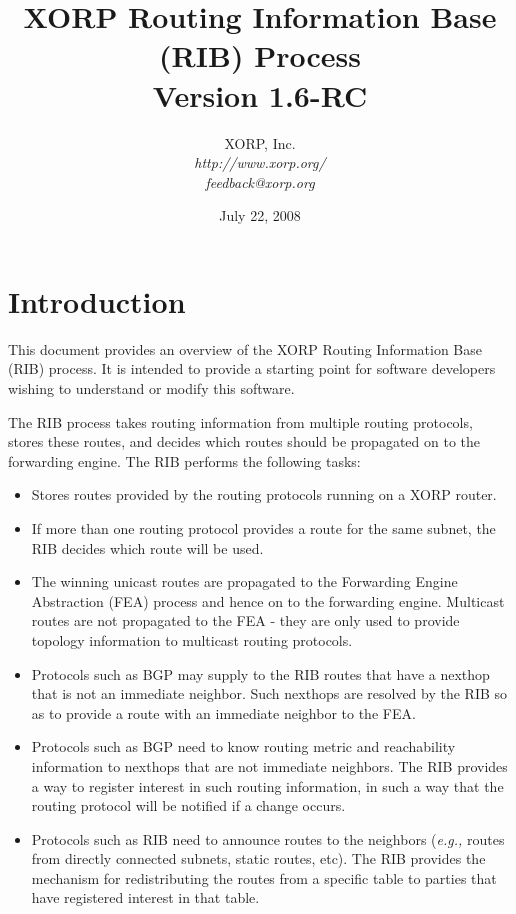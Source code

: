 \documentclass[11pt]{article}
\newcommand{\eg}{\emph{e.g.,}\xspace}
\begin{document}
\title{XORP Routing Information Base (RIB) Process \\
\vspace{1ex}
Version 1.6-RC}
\author{ XORP, Inc.					\\
         {\it http://www.xorp.org/}			\\
	 {\it feedback@xorp.org}
}
\date{July 22, 2008}

\maketitle


\section{Introduction}

This document provides an overview of the XORP Routing Information
Base (RIB) process.  It is intended to provide a starting point for
software developers wishing to understand or modify this software.

The RIB process takes routing information from multiple routing
protocols, stores these routes, and decides which routes should be
propagated on to the forwarding engine.  The RIB performs the following
tasks:

\begin{itemize}

  \item Stores routes provided by the routing protocols running on a XORP
  router.

  \item If more than one routing protocol provides a route for the same
  subnet, the RIB decides which route will be used.

  \item The winning unicast routes are propagated to the Forwarding
  Engine Abstraction (FEA) process and hence on to the forwarding
  engine. Multicast routes are not propagated to the FEA - they are only
  used to provide topology information to multicast routing protocols.

  \item Protocols such as BGP may supply to the RIB routes that have a
  nexthop that is not an immediate neighbor.  Such nexthops are resolved
  by the RIB so as to provide a route with an immediate neighbor to the
  FEA.

  \item Protocols such as BGP need to know routing metric and
  reachability information to nexthops that are not immediate neighbors.
  The RIB provides a way to register interest in such routing
  information, in such a way that the routing protocol will be notified
  if a change occurs.

  \item Protocols such as RIB need to announce routes to the neighbors
  (\eg routes from directly connected subnets, static routes, etc).
  The RIB provides the mechanism for redistributing the routes from
  a specific table to parties that have registered interest in that
  table.

\end{itemize}
\end{document}
